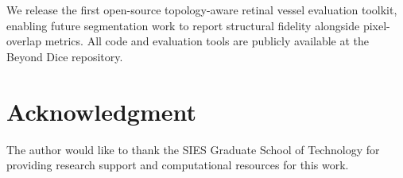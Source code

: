 \documentclass[conference]{IEEEtran}
\begin{document}
We release the first open-source topology-aware retinal vessel evaluation toolkit, enabling future segmentation work to report structural fidelity alongside pixel-overlap metrics. All code and evaluation tools are publicly available at the Beyond Dice repository.

\section*{Acknowledgment}
The author would like to thank the SIES Graduate School of Technology for providing research support and computational resources for this work.

\nocite{*}


\end{document}
